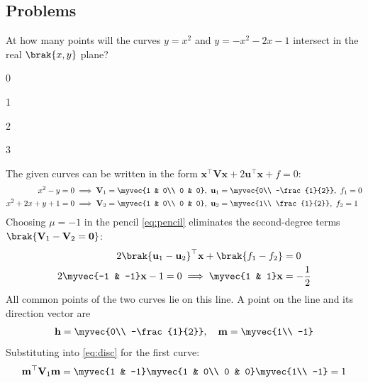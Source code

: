 \subsection{Problems}
\begin{enumerate}[label=1.2.\arabic*,leftmargin=*,labelsep=0.8em,itemsep=2ex]

\problem At how many points will the curves $y = x^2$ and $y = -x^2 - 2x - 1$ intersect in the real $\brak{x,y}$ plane? \gate
\begin{options}
\item 0
\item 1
\item 2
\item 3
\end{options}
\solution The given curves can be written in the form $\mathbf{x}^\top\mathbf{V}\mathbf{x} + 2\mathbf{u}^\top\mathbf{x} + f = 0$:
\begin{align}
x^2 - y = 0 &\implies \mathbf{V}_1 = \myvec{1 & 0\\ 0 & 0},\ \mathbf{u}_1 = \myvec{0\\ -\frac{1}{2}},\ f_1 = 0\\
x^2 + 2x + y + 1 = 0 &\implies \mathbf{V}_2 = \myvec{1 & 0\\ 0 & 0},\ \mathbf{u}_2 = \myvec{1\\ \frac{1}{2}},\ f_2 = 1
\end{align}
Choosing $\mu = -1$ in the pencil \eqref{eq:pencil} eliminates the second-degree terms $\brak{\mathbf{V}_1 - \mathbf{V}_2 = \mathbf{0}}$:
\begin{align}
2\brak{\mathbf{u}_1 - \mathbf{u}_2}^\top\mathbf{x} + \brak{f_1 - f_2} &= 0\\
2\myvec{-1 & -1}\mathbf{x} - 1 = 0 \implies \myvec{1 & 1}\mathbf{x} &= -\frac{1}{2}
\end{align}
All common points of the two curves lie on this line. A point on the line and its direction vector are
\begin{align}
\mathbf{h} = \myvec{0\\ -\frac{1}{2}},\quad \mathbf{m} = \myvec{1\\ -1}
\end{align}
Substituting into \eqref{eq:disc} for the first curve:
\begin{align}
\mathbf{m}^\top\mathbf{V}_1\mathbf{m} &= \myvec{1 & -1}\myvec{1 & 0\\ 0 & 0}\myvec{1\\ -1} = 1\\

\end{align}
\end{enumerate}
